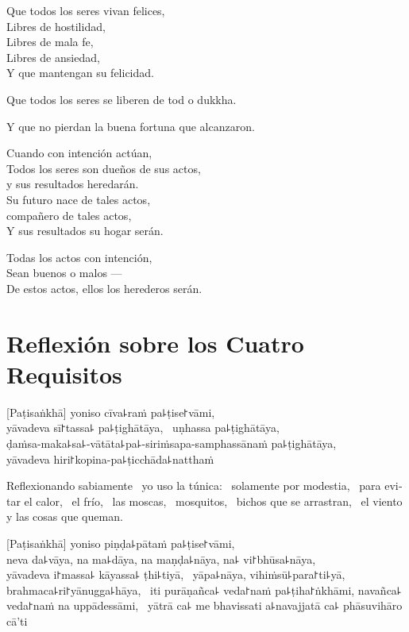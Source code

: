 Que todos los seres vivan felices,\\
Libres de hostilidad,\\
Libres de mala fe,\\
Libres de ansiedad,\\
Y que mantengan su felicidad.

Que todos los seres se liberen de tod
o dukkha.

Y que no pierdan la buena fortuna que alcanzaron.

Cuando con intención actúan,\\
Todos los seres son dueños de sus actos, \\ 
y sus resultados heredarán.\\
Su futuro nace de tales actos, \\
compañero de tales actos,\\
Y sus resultados su hogar serán.
\enlargethispage{3\baselineskip}

Todas los actos con intención,\\
Sean buenos o malos ---\\
De estos actos, ellos los herederos serán.

\chapter[Cuatro Requisitos]{Reflexión sobre los Cuatro Requisitos}


\begin{leader}
\end{leader}

[Paṭisaṅkhā] yoniso cīva꜕raṁ pa꜕ṭise꜓vāmi, \pause\\
yāvadeva sī꜓tassa꜕ pa꜕ṭighātāya, \pause\ uṇhassa pa꜕ṭighātāya, \pause\\
ḍaṁsa-maka꜕sa꜕-vātāta꜕pa꜕-siriṁsapa-samphassānaṁ pa꜕ṭighātāya, \pause\\
yāvadeva hiri꜓kopina-pa꜕ṭicchāda꜕natthaṁ

\begin{english}
  Reflexionando sabiamente \pause\ yo uso la túnica: \pause\ solamente por modestia, \pause\
  para evitar el calor, \pause\ el frío, \pause\ las moscas, \pause\ mosquitos,
  \pause\ bichos que se arrastran, \pause\ el viento y las cosas que queman.
\end{english}

[Paṭisaṅkhā] yoniso piṇḍa꜕pātaṁ pa꜕ṭise꜓vāmi, \pause\\
neva da꜕vāya, na ma꜕dāya, na maṇḍa꜕nāya, na꜕ vi꜓bhūsa꜕nāya, \pause\\
yāvadeva i꜓massa꜕ kāyassa꜕ ṭhi꜕tiyā, \pause\ yāpa꜕nāya, vihiṁsū꜕para꜓ti꜕yā, \pause\\
brahmaca꜕ri꜓yānugga꜕hāya, \pause\ iti purāṇañca꜕ veda꜓naṁ pa꜕ṭiha꜓ṅkhāmi,
navañca꜕ veda꜓naṁ na uppādessāmi, \pause\ yātrā ca꜕ me bhavissati a꜕navajjatā
ca꜕ phāsuvihāro cā'ti

